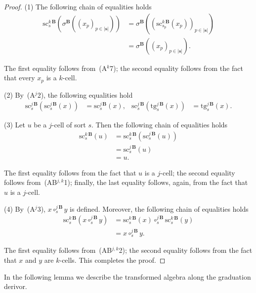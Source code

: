 \documentclass[a4paper, reqno]{amsbook}
\newcommand{\bb}[1]{\ensuremath{\lvert #1 \rvert}}
\newcommand{\src}{\mathrm{sc}}
\newcommand{\tgt}{\mathrm{tg}}
\theoremstyle{plain}
\theoremstyle{definition}
\begin{document}
\begin{proof}
(1) The following chain of equalities holds
\begin{align*}
\src^{k\,\mathbf{B}}_{s}\left(\sigma^{\mathbf{B}}\left((x_{p})_{p\in\bb{\mathbf{s}}}\right)\right)
&=
\sigma^{\mathbf{B}}\left(\left(\src^{k\,\mathbf{B}}_{s_{p}}(x_{p})\right)_{p\in\bb{\mathbf{s}}}\right)
\tag{1}
\\&=
\sigma^{\mathbf{B}}\left((x_{p})_{p\in\bb{\mathbf{s}}}\right).
\tag{2}
\end{align*}

The first equality follows from~(A$^{k}$7); the second equality follows from the fact that every $x_{p}$ is a $k$-cell.

(2) By~(A$^{j}$2), the following equalities hold
\begin{align*}
\src^{j\,\mathbf{B}}_{s}\left(\src^{j\,\mathbf{B}}_{s}(x)\right)
&=
\src^{j\,\mathbf{B}}_{s}(x),
&
\src^{j\,\mathbf{B}}_{s}\left(\tgt^{j\,\mathbf{B}}_{s}(x)\right)
&=
\tgt^{j\,\mathbf{B}}_{s}(x).
\end{align*}

(3) Let $u$ be a $j$-cell of sort $s$.
Then the following chain of equalities holds
\begin{align*}
\src^{k\,\mathbf{B}}_{s}(u)
&=
\src^{k\,\mathbf{B}}_{s}\left(\src^{j\,\mathbf{B}}_{s}(u)\right)
\tag{1}
\\&=
\src^{j\,\mathbf{B}}_{s}(u)
\tag{2}
\\&=
u.
\tag{3}
\end{align*}

The first equality follows from the fact that $u$ is a $j$-cell; the second equality follows from~(AB$^{j,k}$1); finally, the last equality follows, again, from the fact that $u$ is a $j$-cell.

(4) By~(A$^{j}$3), $x\circ^{j\,\mathbf{B}}_{s}y$ is defined.
Moreover, the following chain of equalities holds
\begin{align*}
\src^{k\,\mathbf{B}}_{s}\left(x\circ^{j\,\mathbf{B}}_{s}y\right)
&=
\src^{k\,\mathbf{B}}_{s}(x)\circ^{j\,\mathbf{B}}_{s}\src^{k\,\mathbf{B}}_{s}(y)
\tag{1}
\\&=
x\circ^{j\,\mathbf{B}}_{s}y.
\tag{2}
\end{align*}

The first equality follows from~(AB$^{j,k}$2); the second equality follows from the fact that $x$ and $y$ are $k$-cells. This completes the proof.
\end{proof}

In the following lemma we describe the transformed algebra along the graduation derivor.
\end{document}
